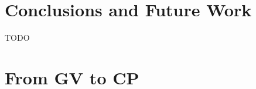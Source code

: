 \documentclass{easychair}
\newcommand{\key}{\mathsf}
\newcommand{\gvEndOutput}{\key{end}_!}
\newcommand{\gvServer}[1]{\flat {#1}}
\newcommand{\gvService}[1]{\sharp {#1}}
\newcommand{\gvDual}[1]{\overline{#1}}
\newcommand{\gvOutputType}[2]{![{#1}].{#2}}
\newcommand{\gvInputType}[2]{?[{#1}].{#2}}
\newcommand{\gvj}[3]{{#1} \vdash {#2} : {#3}}
\newcommand{\gvLink}[2]{\key{link}~{#1}~{#2}}
\newcommand{\gvSendType}[2]{\key{sendType}~{#1}~{#2}}
\newcommand{\gvReceiveType}[1]{\key{receiveType}~{#1}}
\newcommand{\gvServe}[3]{\key{serve}~{#1}({#2})={#3}}
\newcommand{\gvRequest}[1]{\key{request}~{#1}}
\newcommand{\FV}[1]{\mathit{FV}(#1)}
\begin{document}
\section{Conclusions and Future Work}

TODO

\cite{wadler2014jfp}

\label{sect:bib}

%
%
%










\newpage

\section{From GV to CP}
~
\end{document}
